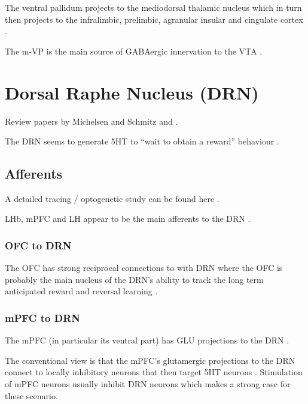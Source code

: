 \documentclass[12pt,a4paper]{article}
\begin{document}
The ventral pallidum projects to the mediodorsal thalamic nucleus which in turn then 
projects to the infralimbic, prelimbic, agranular insular and cingulate cortex \citep{Ikemoto2007}.

The m-VP is the main source of GABAergic innervation to the VTA \citep{Sesack2010}.








\section{Dorsal Raphe Nucleus (DRN)}

Review papers by Michelsen and Schmitz \citep{Michelsen2007} and \citep{Nakamura2013}.

The DRN seems to generate 5HT to “wait to obtain a reward” behaviour  \citep{Nakamura2013}.

\subsection{Afferents}

A detailed tracing / optogenetic study can be found here  \citep{PollakDorocic2014}.

LHb, mPFC and LH appear to be the main afferents to the DRN \citep{Vertes2010} \citep{Sparta2014} \citep{Lee2003}.

\subsubsection{OFC to DRN}

The OFC has strong reciprocal connections to with DRN \citep{Zhou2015} where the OFC is probably the main nucleus of the DRN's ability to track the long term anticipated reward and reversal learning \citep{Roberts2011}.

\subsubsection{mPFC to DRN}

The mPFC (in particular its ventral part) has GLU projections to the DRN \citep{Goncalves2009} \citep{Lee2003}.

The conventional view is that the mPFC’s glutamergic projections to the DRN connect to locally inhibitory neurons that then target 5HT neurons \citep{Celada2001}. Stimulation of mPFC neurons usually inhibit DRN neurons which makes a strong case for these scenario.
\end{document}
